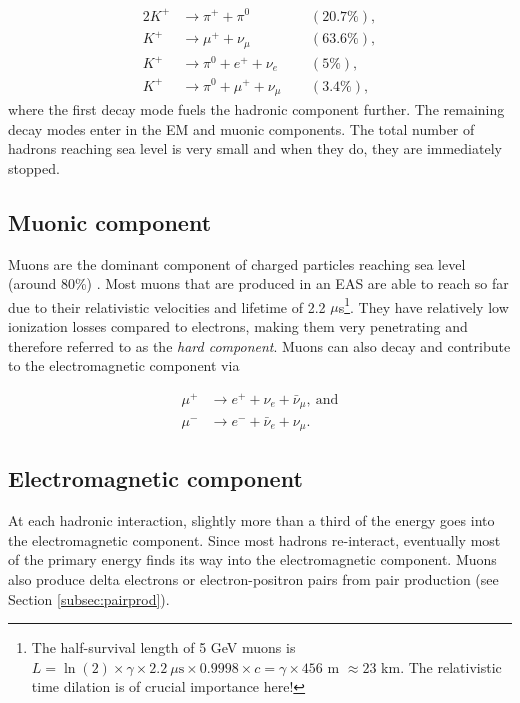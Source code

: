 \begin{alignat}{2}
K^+ &\rightarrow \pi^+ + \pi^0  &&(20.7\%),\nonumber \\
K^+ &\rightarrow \mu^+ + \nu_{\mu}  &&(63.6\%),\nonumber \\
K^+ &\rightarrow \pi^0 + e^+ + \nu_e  &&(5\%),\nonumber \\
K^+ &\rightarrow \pi^0 + \mu^+ + \nu_{\mu}  \ \ &&(3.4\%), \label{eq:hadronic} 
\end{alignat} 
where the first decay mode fuels the hadronic component further. The remaining decay modes enter in the EM and muonic components. The total number of hadrons reaching sea level is very small and when they do, they are immediately stopped.

\subsection{Muonic component}
Muons are the dominant component of charged particles reaching sea level (around 80\%) \cite{Grupen:2005rx}. Most muons that are produced in an EAS are able to reach so far due to their relativistic velocities and lifetime of 2.2 $\mu$s\footnote{The half-survival length of 5 GeV muons is $L = \ln(2) \times \gamma \times 2.2 \ \mu\textrm{s} \times 0.9998 \times c = \gamma \times 456$ m $\approx 23$ km. The relativistic time dilation is of crucial importance here!}. They have relatively low ionization losses compared to electrons, making them very penetrating and therefore referred to as the \textit{hard component}. Muons can also decay and contribute to the electromagnetic component via

\begin{equation}
\label{eq:muonic}
\begin{split}
\mu^+ &\rightarrow e^+ + \nu_e + \bar{\nu}_\mu, \ \textrm{and} \\
\mu^- &\rightarrow e^- + \bar{\nu}_e + \nu_\mu.
\end{split}
\end{equation}

\subsection{Electromagnetic component}
At each hadronic interaction, slightly more than a third of the energy goes into the electromagnetic component. Since most hadrons re-interact, eventually most of the primary energy finds its way into the electromagnetic component. Muons also produce delta electrons or electron-positron pairs from pair production (see Section \ref{subsec:pairprod}).

